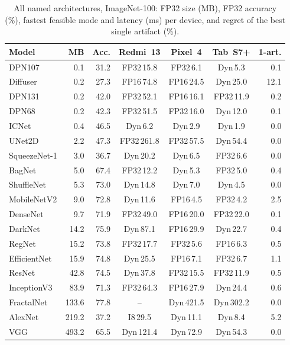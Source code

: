 \begin{table}[!t]
\centering
\caption{All named architectures, ImageNet-100: FP32 size (MB), FP32 accuracy (\%), fastest feasible mode and latency (ms) per device, and regret of the best single artifact (\%).}
\label{tab:named_im}
\footnotesize
\setlength{\tabcolsep}{2.5pt}
\begin{tabular}{@{}lrrcccr@{}}
\toprule
\textbf{Model} & \textbf{MB} & \textbf{Acc.} & \textbf{Redmi~13} & \textbf{Pixel~4} & \textbf{Tab~S7+} & \textbf{1-art.}\\
\midrule
DPN107 & 0.1 & 31.2 & FP32\,15.8 & FP32\,6.1 & Dyn\,5.3 & 0.1 \\
Diffuser & 0.2 & 27.3 & FP16\,74.8 & FP16\,24.5 & Dyn\,25.0 & 12.1 \\
DPN131 & 0.2 & 42.0 & FP32\,52.1 & FP16\,16.1 & FP32\,11.9 & 0.2 \\
DPN68 & 0.2 & 42.3 & FP32\,51.5 & FP32\,16.0 & Dyn\,12.0 & 0.1 \\
ICNet & 0.4 & 46.5 & Dyn\,6.2 & Dyn\,2.9 & Dyn\,1.9 & 0.0 \\
UNet2D & 2.2 & 47.3 & FP32\,261.8 & FP32\,57.5 & Dyn\,54.4 & 0.0 \\
SqueezeNet-1 & 3.0 & 36.7 & Dyn\,20.2 & Dyn\,6.5 & FP32\,6.6 & 0.0 \\
BagNet & 5.0 & 67.4 & FP32\,12.2 & Dyn\,5.3 & FP32\,5.0 & 0.4 \\
ShuffleNet & 5.3 & 73.0 & Dyn\,14.8 & Dyn\,7.0 & Dyn\,4.5 & 0.0 \\
MobileNetV2 & 9.0 & 72.8 & Dyn\,11.6 & FP16\,4.5 & FP32\,4.2 & 2.5 \\
DenseNet & 9.7 & 71.9 & FP32\,49.0 & FP16\,20.0 & FP32\,22.0 & 0.1 \\
DarkNet & 14.2 & 75.9 & Dyn\,87.1 & FP16\,29.9 & Dyn\,22.7 & 0.4 \\
RegNet & 15.2 & 73.8 & FP32\,17.7 & FP32\,5.6 & FP16\,6.3 & 0.5 \\
EfficientNet & 15.9 & 74.8 & Dyn\,25.5 & FP16\,7.1 & FP32\,6.7 & 1.1 \\
ResNet & 42.8 & 74.5 & Dyn\,37.8 & FP32\,15.5 & FP32\,11.9 & 0.5 \\
InceptionV3 & 83.9 & 71.3 & FP32\,64.3 & FP16\,27.9 & Dyn\,24.4 & 0.6 \\
FractalNet & 133.6 & 77.8 & -- & Dyn\,421.5 & Dyn\,302.2 & 0.0 \\
AlexNet & 219.2 & 37.2 & I8\,29.5 & Dyn\,11.1 & Dyn\,8.4 & 5.2 \\
VGG & 493.2 & 65.5 & Dyn\,121.4 & Dyn\,72.9 & Dyn\,54.3 & 0.0 \\
\bottomrule
\end{tabular}
\end{table}

